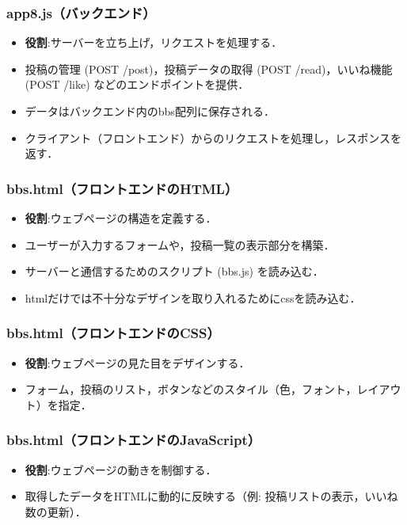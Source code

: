\documentclass[uplatex,dvipdfmx]{jsarticle}
\begin{document}
\subsubsection{app8.js（バックエンド）}
\begin{itemize}
    \item \textbf{役割}:サーバーを立ち上げ，リクエストを処理する．
    \item 投稿の管理 (POST /post)，投稿データの取得 (POST /read)，いいね機能 (POST /like) などのエンドポイントを提供．
    \item データはバックエンド内のbbs配列に保存される．
    \item クライアント（フロントエンド）からのリクエストを処理し，レスポンスを返す．
\end{itemize}

\subsubsection{bbs.html（フロントエンドのHTML）}
\begin{itemize}
    \item \textbf{役割}:ウェブページの構造を定義する．
    \item ユーザーが入力するフォームや，投稿一覧の表示部分を構築．
    \item サーバーと通信するためのスクリプト (bbs.js) を読み込む．
    \item htmlだけでは不十分なデザインを取り入れるためにcssを読み込む．
\end{itemize}

\subsubsection{bbs.html（フロントエンドのCSS）}
\begin{itemize}
    \item \textbf{役割}:ウェブページの見た目をデザインする．
    \item フォーム，投稿のリスト，ボタンなどのスタイル（色，フォント，レイアウト）を指定．
\end{itemize}

\subsubsection{bbs.html（フロントエンドのJavaScript）}
\begin{itemize}
    \item \textbf{役割}:ウェブページの動きを制御する．
    \item 取得したデータをHTMLに動的に反映する（例: 投稿リストの表示，いいね数の更新）．
\end{itemize}
\end{document}
